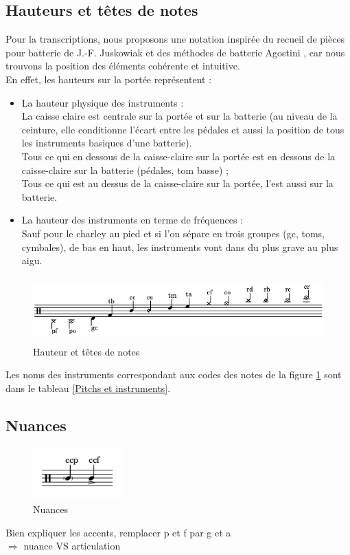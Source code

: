 \subsection*{Hauteurs et têtes de notes}
Pour la transcriptions, nous proposons une notation inspirée du recueil de pièces pour batterie de J.-F. Juskowiak \cite{jusko} et des méthodes de batterie Agostini \cite{ago_meth_3}, car nous trouvons la position des éléments cohérente et intuitive.\\
En effet, les hauteurs sur la portée représentent :
\begin{itemize}
	\item La hauteur physique des instruments :\\
	La caisse claire est centrale sur la portée et sur la batterie (au niveau de la ceinture, elle conditionne l’écart entre les pédales et aussi la position de tous les instruments basiques d’une batterie).\\
	Tous ce qui en dessous de la caisse-claire sur la portée est en dessous de la caisse-claire sur la batterie (pédales, tom basse) ;\\
	Tous ce qui est au dessus de la caisse-claire sur la portée, l’est aussi sur la batterie.\\
	\item La hauteur des instruments en terme de fréquences :\\
	Sauf pour le charley au pied et si l’on sépare en trois groupes (gc, toms, cymbales), de bas en haut, les instruments vont dans du plus grave au plus aigu.
\end{itemize}
\begin{figure}[!h]
	\centering
	\includegraphics[height=25mm, width=130mm]{z_images/description_notation/notes.png}
	\caption{Hauteur et têtes de notes}
	\label{Hauteur et têtes de notes}
\end{figure}
Les noms des instruments correspondant aux codes des notes de la figure \ref{Hauteur et têtes de notes} sont dans le tableau \ref{Pitchs et instruments}.
\subsection*{Nuances}
\begin{figure}[!h]
	\centering
	\includegraphics[height=20mm, width=35mm]{z_images/description_notation/nuances.png}
	\caption{Nuances}
\end{figure}
Bien expliquer les accents, remplacer p et f par g et a\\
$\Rightarrow$ nuance VS articulation\


